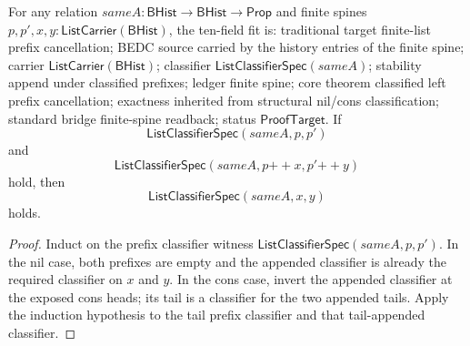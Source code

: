 \begin{theorem}
\label{thm:list-classifier-source-append-left-cancel-classified}
For any relation $sameA:\mathsf{BHist}\to\mathsf{BHist}\to\mathsf{Prop}$ and
finite spines $p,p',x,y:\mathsf{ListCarrier}(\mathsf{BHist})$, the ten-field
fit is: traditional target finite-list prefix cancellation; BEDC source carried
by the history entries of the finite spine; carrier
$\mathsf{ListCarrier}(\mathsf{BHist})$; classifier
$\mathsf{ListClassifierSpec}(sameA)$; stability append under classified
prefixes; ledger finite spine; core theorem classified left prefix
cancellation; exactness inherited from structural nil/cons classification;
standard bridge finite-spine readback; status $\mathsf{ProofTarget}$. If
$$
\mathsf{ListClassifierSpec}(sameA,p,p')
$$
and
$$
\mathsf{ListClassifierSpec}(sameA,p{++}x,p'{++}y)
$$
hold, then
$$
\mathsf{ListClassifierSpec}(sameA,x,y)
$$
holds.
\end{theorem}
\begin{proof}
Induct on the prefix classifier witness
$\mathsf{ListClassifierSpec}(sameA,p,p')$. In the nil case, both prefixes are
empty and the appended classifier is already the required classifier on $x$ and
$y$. In the cons case, invert the appended classifier at the exposed cons heads;
its tail is a classifier for the two appended tails. Apply the induction
hypothesis to the tail prefix classifier and that tail-appended classifier.
\end{proof}

